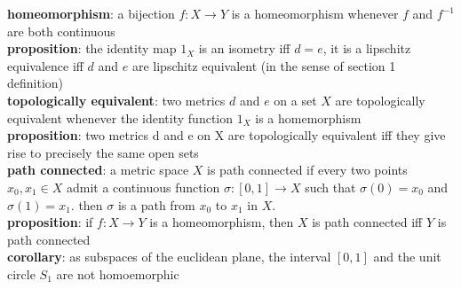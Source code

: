 \documentclass[a4paper]{article}
\begin{document}
\begin{framed}
	\noindent
	\textbf{homeomorphism}: a bijection $f: X \rightarrow Y$ is a homeomorphism whenever $f$ and $f^{-1}$ are both continuous\\
	
	\noindent
	\textbf{proposition}: the identity map $1_X$ is an isometry iff $d = e$, it is a lipschitz equivalence iff $d$ and $e$ are lipschitz equivalent (in the sense of section 1 definition)\\
	
	\noindent
	\textbf{topologically equivalent}: two metrics $d$ and $e$ on a set $X$ are topologically equivalent whenever the identity function $1_X$ is a homemorphism\\
	
	\noindent
	\textbf{proposition}: two metrics d and e on X are topologically equivalent iff they give rise to precisely the same open sets\\
	
	\noindent
	\textbf{path connected}: a metric space $X$ is path connected if every two points $x_0, x_1 \in X$ admit a continuous function $\sigma: [0, 1] \rightarrow X$ such that $\sigma(0) = x_0$ and $\sigma(1) = x_1$. then $\sigma$ is a path from $x_0$ to $x_1$ in $X$.\\
	
	\noindent
	\textbf{proposition}: if $f: X \rightarrow Y$ is a homeomorphism, then $X$ is path connected iff $Y$ is path connected\\
	
	\noindent
	\textbf{corollary}: as subspaces of the euclidean plane, the interval $[0, 1]$ and the unit circle $S_1$ are not homoemorphic
\end{framed}
\end{document}
